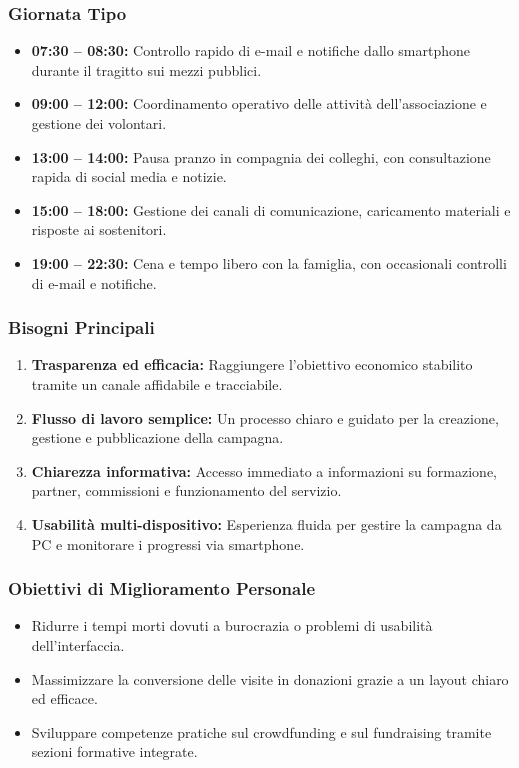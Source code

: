 \documentclass[11pt,a4paper]{article}
\begin{document}
\subsubsection{Giornata Tipo}
\begin{itemize}
    \item \textbf{07:30 -- 08:30:} Controllo rapido di e-mail e notifiche dallo smartphone durante il tragitto sui mezzi pubblici.
    \item \textbf{09:00 -- 12:00:} Coordinamento operativo delle attività dell'associazione e gestione dei volontari.
    \item \textbf{13:00 -- 14:00:} Pausa pranzo in compagnia dei colleghi, con consultazione rapida di social media e notizie.
    \item \textbf{15:00 -- 18:00:} Gestione dei canali di comunicazione, caricamento materiali e risposte ai sostenitori.
    \item \textbf{19:00 -- 22:30:} Cena e tempo libero con la famiglia, con occasionali controlli di e-mail e notifiche.
\end{itemize}

\subsubsection{Bisogni Principali}
\begin{enumerate}
    \item \textbf{Trasparenza ed efficacia:} Raggiungere l'obiettivo economico stabilito tramite un canale affidabile e tracciabile.
    \item \textbf{Flusso di lavoro semplice:} Un processo chiaro e guidato per la creazione, gestione e pubblicazione della campagna.
    \item \textbf{Chiarezza informativa:} Accesso immediato a informazioni su formazione, partner, commissioni e funzionamento del servizio.
    \item \textbf{Usabilità multi-dispositivo:} Esperienza fluida per gestire la campagna da PC e monitorare i progressi via smartphone.
\end{enumerate}

\subsubsection{Obiettivi di Miglioramento Personale}
\begin{itemize}
    \item Ridurre i tempi morti dovuti a burocrazia o problemi di usabilità dell'interfaccia.
    \item Massimizzare la conversione delle visite in donazioni grazie a un layout chiaro ed efficace.
    \item Sviluppare competenze pratiche sul crowdfunding e sul fundraising tramite sezioni formative integrate.
\end{itemize}
\end{document}
